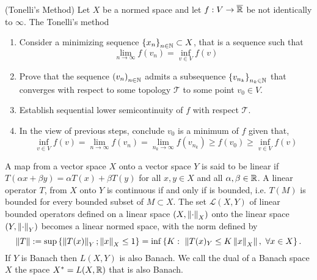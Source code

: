 \begin{theorem}(Tonelli's Method)
	Let $X$ be a normed space and let $f:V\rightarrow \overline{\mathbb{R}}$ be not identically to $\infty$. The Tonelli's method
	\begin{enumerate}
		\item Consider a minimizing sequence $\left\lbrace x_n \right\rbrace_{n\in \mathbb{N}}\subset X$, that is a sequence such that
		\begin{equation*}
		\lim_{n\rightarrow\infty}f(v_n)=\inf_{v\in V}f(v)
		\end{equation*}
		\item Prove that the sequence $\left( v_n \right)_{n\in \mathbb{N}}$ admits a subsequence $\left\lbrace v_{n_k} \right\rbrace_{n_k\in \mathbb{N}}$ that converges with respect to some topology $\mathcal T$ to some point $v_0\in V$.
		\item Establish sequential lower semicontinuity of $f$ with respect $\mathcal T$.
		\item In the view of previous steps, conclude $v_0$ is a minimum of $f$ given that,
		\begin{equation}
			\inf_{v\in V}f(v)=\lim_{n\rightarrow\infty }f(v_n)=\lim_{n_k\rightarrow \infty}f(v_{n_k})\geq f(v_0)\geq \inf_{v\in V}f(v)
		\end{equation}
	\end{enumerate}
\end{theorem}
A map from a vector space $X$ onto a vector space $Y$ is said to be linear if $T(\alpha x+\beta y)=\alpha T(x)+\beta T(y)$ for all $x,y\in X$ and all $\alpha, \beta \in \mathbb{R}$. A linear operator $T$, from $X$ onto $Y$ is continuous if and only if is bounded, i.e. $T(M)$ is bounded for every bounded subset of $M\subset X$. The set $\mathcal{L}(X,Y)$ of linear bounded operators defined on a linear space $(X, \left\|\cdot\right\|_X)$ onto the linear space $(Y, \left\|\cdot\right\|_Y)$ becomes a linear normed space, with the norm defined by
\begin{equation*}
	\norm{T}:=\sup\braces{\norm{T(x)}_Y; \norm{x}_X\leq 1}=\inf\braces{K:\ \norm{T(x)_Y\leq K\norm{x}_X},\ \forall x \in X}.
\end{equation*}
If $Y$ is Banach then $L(X, Y)$ is also Banach. We call the dual of a Banach space $X$ the space $X^*=L(X,\mathbb{R})$ that is also Banach. 

